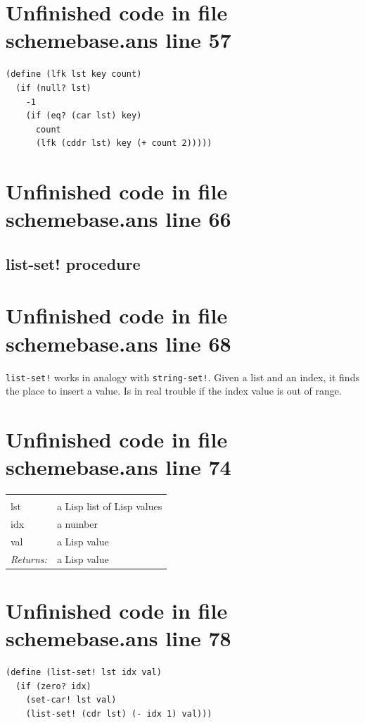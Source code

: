 \documentclass[twoside,9pt]{report}
\begin{document}
\section{Unfinished code in file schemebase.ans line 57}
\begin{lstlisting}
(define (lfk lst key count)
  (if (null? lst)
    -1
    (if (eq? (car lst) key)
      count
      (lfk (cddr lst) key (+ count 2)))))
\end{lstlisting}
\section{Unfinished code in file schemebase.ans line 66}
\subsection{list-set! procedure}
\label{list-set"!-procedure}
\section{Unfinished code in file schemebase.ans line 68}


\texttt{list-set!} works in analogy with \texttt{string-set!}. Given a list and an index, it finds the place to insert a value. Is in real trouble if the index value is out of range.

\section{Unfinished code in file schemebase.ans line 74}
\noindent\begin{tabular}{ |p{1.9cm} p{8cm}| }
\hline
\rowcolor[HTML]{CCCCCC} \multicolumn{2}{|l|}{\bf list-set! (public)} \\
lst & a Lisp list of Lisp values \\
idx & a number \\
val & a Lisp value \\
\textit{Returns:} & a Lisp value \\
\hline
\end{tabular}
\section{Unfinished code in file schemebase.ans line 78}
\begin{lstlisting}
(define (list-set! lst idx val)
  (if (zero? idx)
    (set-car! lst val)
    (list-set! (cdr lst) (- idx 1) val)))
\end{lstlisting}
\end{document}
